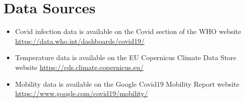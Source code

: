 \documentclass[12pt]{article}
\begin{document}
\pagebreak

    \appendix
    \section{Data Sources}
    \begin{itemize}
        \item Covid infection data is available on the Covid section of the WHO website \url{https://data.who.int/dashboards/covid19/}
        \item Temperature data is available on the EU Copernicus Climate Data Store website \url{https://cds.climate.copernicus.eu/}
        \item Mobility data is available on the Google Covid19 Mobility Report website \url{https://www.google.com/covid19/mobility/}
    \end{itemize}
\end{document}
